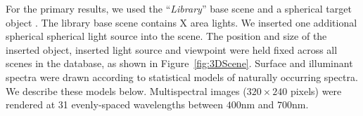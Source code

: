 \documentclass{jov}
\begin{document}

For the primary results, we used the ``{\it Library}'' base scene and a spherical target object .
The library base scene contains X area lights. We inserted one additional spherical spherical light source into the scene.
The position and size of the inserted object, inserted light source and viewpoint were held fixed across all scenes in the database,
as shown in Figure~\ref{fig:3DScene}.
Surface and illuminant spectra were drawn according to statistical models of naturally occurring spectra.
We describe these models below.
Multispectral images ($320 \times 240$ pixels) were rendered at 31 evenly-spaced wavelengths between $400$nm and $700$nm.


\end{document}
